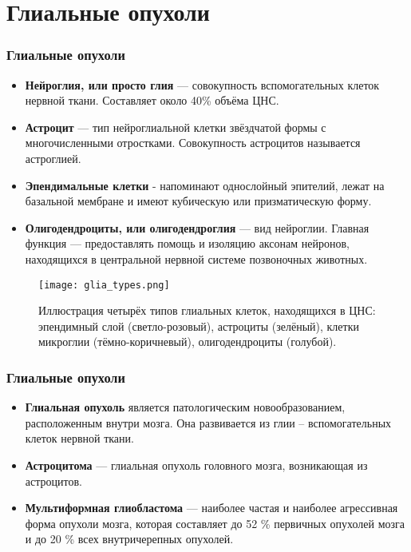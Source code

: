 
\section{Глиальные опухоли}

\begin{frame}
  \frametitle{Глиальные опухоли}

  \begin{itemize}
  \item \textbf{Нейроглия, или просто глия}  — совокупность вспомогательных клеток нервной ткани. 
  Составляет около 40\% объёма ЦНС. 
  \item \textbf{Астроцит}  — тип нейроглиальной 
  клетки звёздчатой формы с многочисленными отростками. Совокупность астроцитов называется астроглией.
  \item \textbf{Эпендимальные клетки} - напоминают однослойный эпителий, лежат на базальной мембране и 
  имеют кубическую или призматическую форму.
  \item\textbf{Олигодендроциты, или олигодендроглия} — вид нейроглии. Главная функция — 
  предоставлять помощь и изоляцию аксонам нейронов, находящихся в центральной нервной системе позвоночных животных.
  
  
 \end{itemize}

\end{frame}
\begin{frame}
  \begin{figure}
    \texttt{[image: glia\_types.png]}
    \caption{Иллюстрация четырёх типов глиальных клеток, находящихся в 
    ЦНС: эпендимный слой (светло-розовый), астроциты (зелёный), клетки микроглии (тёмно-коричневый), олигодендроциты (голубой).}
  \end{figure}
\end{frame}

\begin{frame}
  \frametitle{Глиальные опухоли}

  \begin{itemize}
  \item \textbf{Глиальная опухоль} является патологическим новообразованием, расположенным внутри мозга. 
    Она развивается из глии – вспомогательных клеток нервной ткани.
    
  \item \textbf{Астроцитома} — глиальная опухоль головного мозга, возникающая из астроцитов. 

  \item \textbf{Мультиформная глиобластома} — наиболее частая и наиболее агрессивная форма опухоли мозга,
  которая составляет до 52 \% первичных опухолей мозга и до 20 \% всех внутричерепных опухолей. 

\end{itemize}
\end{frame}


